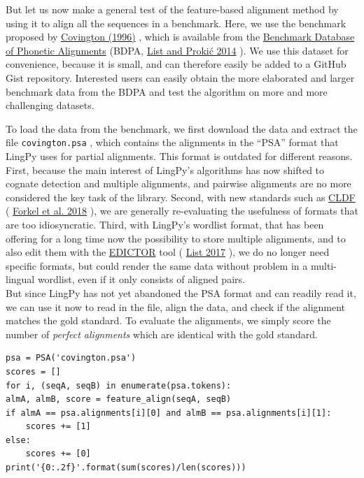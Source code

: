 \documentclass[
  a4paper,
  14pt,
  oneside,
  tablecaptionabove
]{scrbook}
\newcommand{\passthrough}[1]{#1}
\begin{document}
But let us now make a general test of the feature-based alignment method
by using it to align all the sequences in a benchmark. Here, we use the
benchmark proposed by
\href{http://bibliography.lingpy.org?key=Covington1996}{Covington
(1996)} , which is available from the
\href{http://alignments.lingpy.org}{Benchmark Database of Phonetic
Alignments} (BDPA,
\href{http://bibliography.lingpy.org?key=List2014e}{List and Prokić
2014} ). We use this dataset for convenience, because it is small, and
can therefore easily be added to a GitHub Gist repository. Interested
users can easily obtain the more elaborated and larger benchmark data
from the BDPA and test the algorithm on more and more challenging
datasets.

To load the data from the benchmark, we first download the data and
extract the file \passthrough{\lstinline!covington.psa!} , which
contains the alignments in the \enquote{PSA} format that LingPy uses for
partial alignments. This format is outdated for different reasons.
First, because the main interest of LingPy's algorithms has now shifted
to cognate detection and multiple alignments, and pairwise alignments
are no more considered the key task of the library. Second, with new
standards such as \href{https://cldf.clld.org}{CLDF} (
\href{http://bibliography.lingpy.org?key=Forkel2018a}{Forkel et al.
2018} ), we are generally re-evaluating the usefulness of formats that
are too idiosyncratic. Third, with LingPy's wordlist format, that has
been offering for a long time now the possibility to store multiple
alignments, and to also edit them with the
\href{http://edictor.digling.org}{EDICTOR} tool (
\href{http://bibliography.lingpy.org?key=List2017d}{List 2017} ), we do
no longer need specific formats, but could render the same data without
problem in a multi-lingual wordlist, even if it only consists of aligned
pairs.\\
But since LingPy has not yet abandoned the PSA format and can readily
read it, we can use it now to read in the file, align the data, and
check if the alignment matches the gold standard. To evaluate the
alignments, we simply score the number of \emph{perfect alignments}
which are identical with the gold standard.

\begin{lstlisting}
psa = PSA('covington.psa')
scores = []
for i, (seqA, seqB) in enumerate(psa.tokens):
almA, almB, score = feature_align(seqA, seqB)
if almA == psa.alignments[i][0] and almB == psa.alignments[i][1]:
    scores += [1]
else:
    scores += [0]
print('{0:.2f}'.format(sum(scores)/len(scores)))
\end{lstlisting}
\end{document}
